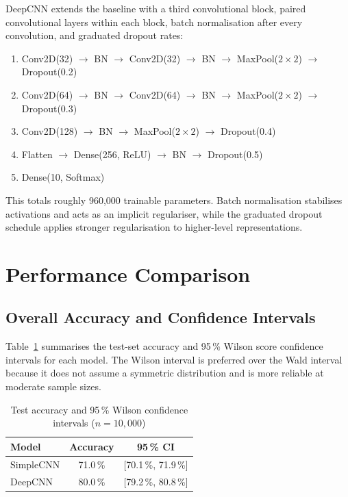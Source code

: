 \documentclass[conference]{IEEEtran}
\begin{document}
DeepCNN extends the baseline with a third convolutional block, paired
convolutional layers within each block, batch normalisation after every
convolution, and graduated dropout rates:

\begin{enumerate}
  \item Conv2D(32) $\to$ BN $\to$ Conv2D(32) $\to$ BN $\to$
        MaxPool($2\times2$) $\to$ Dropout(0.2)
  \item Conv2D(64) $\to$ BN $\to$ Conv2D(64) $\to$ BN $\to$
        MaxPool($2\times2$) $\to$ Dropout(0.3)
  \item Conv2D(128) $\to$ BN $\to$ MaxPool($2\times2$) $\to$ Dropout(0.4)
  \item Flatten $\to$ Dense(256, ReLU) $\to$ BN $\to$ Dropout(0.5)
  \item Dense(10, Softmax)
\end{enumerate}

This totals roughly 960{,}000 trainable parameters.
Batch normalisation stabilises activations and acts as an implicit regulariser,
while the graduated dropout schedule applies stronger regularisation to
higher-level representations.

\section{Performance Comparison}

\subsection{Overall Accuracy and Confidence Intervals}

Table~\ref{tab:accuracy} summarises the test-set accuracy and 95\,\% Wilson
score confidence intervals for each model.
The Wilson interval is preferred over the Wald interval because it does not
assume a symmetric distribution and is more reliable at moderate sample sizes.

\begin{table}[ht]
  \centering
  \caption{Test accuracy and 95\,\% Wilson confidence intervals ($n = 10{,}000$)}
  \label{tab:accuracy}
  \begin{tabular}{lcc}
    \toprule
    Model     & Accuracy & 95\,\% CI \\
    \midrule
    SimpleCNN & 71.0\,\% & [70.1\,\%, 71.9\,\%] \\
    DeepCNN   & 80.0\,\% & [79.2\,\%, 80.8\,\%] \\
    \bottomrule
  \end{tabular}
\end{table}
\end{document}
